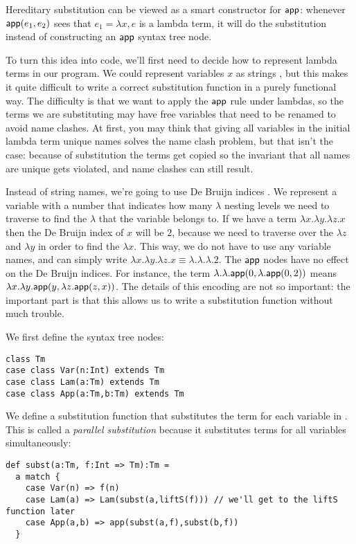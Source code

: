 Hereditary substitution can be viewed as a smart constructor for $\mathsf{app}$: whenever $\mathsf{app}(e_1,e_2)$ sees that $e_1 = \lambda x, e$ is a lambda term, it will do the substitution instead of constructing an $\mathsf{app}$ syntax tree node.

To turn this idea into code, we'll first need to decide how to represent lambda terms in our program.
We could represent variables $x$ as strings , but this makes it quite difficult to write a correct substitution function in a purely functional way.
The difficulty is that we want to apply the $\mathsf{app}$ rule under lambdas, so the terms we are substituting may have free variables that need to be renamed to avoid name clashes.
At first, you may think that giving all variables in the initial lambda term unique names solves the name clash problem, but that isn't the case: because of substitution the terms get copied so the invariant that all names are unique gets violated, and name clashes can still result.

Instead of string names, we're going to use De Bruijn indices \cite{BruijnIndex2021}.
We represent a variable with a number that indicates how many $\lambda$ nesting levels we need to traverse to find the $\lambda$ that the variable belongs to.
If we have a term $\lambda x. \lambda y. \lambda z. x$ then the De Bruijn index of $x$ will be $2$, because we need to traverse over the $\lambda z$ and $\lambda y$ in order to find the $\lambda x$.
This way, we do not have to use any variable names, and can simply write $\lambda x. \lambda y. \lambda z. x \equiv \lambda. \lambda. \lambda. 2$.
The $\mathsf{app}$ nodes have no effect on the De Bruijn indices.
For instance, the term $\lambda. \lambda. \mathsf{app}(0,\lambda. \mathsf{app}(0,2))$ means $\lambda x. \lambda y. \mathsf{app}(y, \lambda z. \mathsf{app}(z,x))$.
The details of this encoding are not so important: the important part is that this allows us to write a substitution function without much trouble.

We first define the syntax tree nodes:
\begin{lstlisting}
class Tm
case class Var(n:Int) extends Tm
case class Lam(a:Tm) extends Tm
case class App(a:Tm,b:Tm) extends Tm
\end{lstlisting}

We define a substitution function  that substitutes the term  for each variable  in . This is called a \emph{parallel substitution} because it substitutes terms for all variables simultaneously:

\begin{lstlisting}
def subst(a:Tm, f:Int => Tm):Tm =
  a match {
    case Var(n) => f(n)
    case Lam(a) => Lam(subst(a,liftS(f))) // we'll get to the liftS function later
    case App(a,b) => app(subst(a,f),subst(b,f))
  }
\end{lstlisting}

